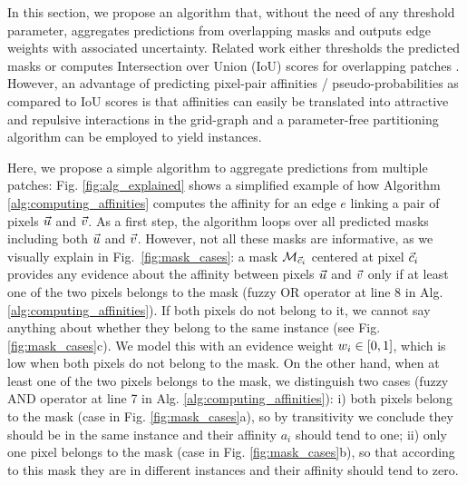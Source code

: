 In this section, we propose an algorithm that, without the need of any threshold parameter, aggregates predictions from overlapping \maskname masks and outputs edge weights with associated uncertainty.
Related work either thresholds the predicted \maskname masks \cite{januszewski2018high,hirsch2020patchperpix,meirovitch2016multi} or computes Intersection over Union (IoU) scores for overlapping patches \cite{liu2016multi}. However, an advantage of predicting pixel-pair affinities / pseudo-probabilities as compared to IoU scores is that affinities can easily be translated into attractive and repulsive interactions in the grid-graph 
and a parameter-free partitioning algorithm can be employed to yield instances.

Here, we propose a simple algorithm to aggregate predictions from multiple patches: Fig. \ref{fig:alg_explained} shows a simplified example of how Algorithm \ref{alg:computing_affinities} computes the affinity for an edge $e$ linking a pair of pixels $\vec{u}$ and $\vec{v}$.
As a first step, the algorithm loops over all predicted \maskname masks including both $\vec{u}$ and $\vec{v}$. 
However, not all these masks are informative, as we visually explain in Fig.~\ref{fig:mask_cases}: a mask $\mathcal{M}_{\vec{c}_i}$ centered at pixel $\vec{c}_i$ provides any evidence about the affinity between pixels $\vec{u}$ and $\vec{v}$ only if at least one of the two pixels belongs to the mask (fuzzy OR operator at line 8 in Alg. \ref{alg:computing_affinities}).
If both pixels do not belong to it, we cannot say anything about whether they belong to the same instance (see Fig. \ref{fig:mask_cases}c). We model this with an evidence weight $w_i\in[0,1]$, which is low when both pixels do not belong to the mask.
On the other hand, when at least one of the two pixels belongs to the mask, we distinguish two cases (fuzzy AND operator at line 7 in Alg. \ref{alg:computing_affinities}): i)
both pixels belong to the mask  (case in Fig. \ref{fig:mask_cases}a), so by transitivity we conclude they should be in the same instance and their affinity $a_i$ should tend to one; 
ii) only one pixel belongs to the mask (case in Fig. \ref{fig:mask_cases}b), so that according to this mask they are in different instances and their affinity should tend to zero. 

